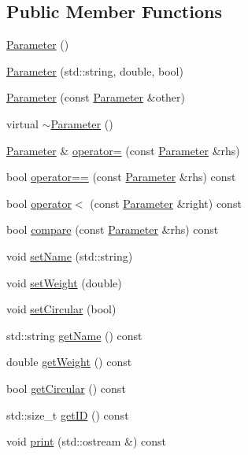 \subsection*{Public Member Functions}
\begin{DoxyCompactItemize}
\item 
\mbox{\hyperlink{classanen_par_1_1_parameter_aada3139ee9b50c2acb90d275c72da550}{Parameter}} ()
\item 
\mbox{\hyperlink{classanen_par_1_1_parameter_a2c0360abe051ca5ca67d812f75987918}{Parameter}} (std\+::string, double, bool)
\item 
\mbox{\hyperlink{classanen_par_1_1_parameter_af9f49a6e54e55e223f14ed4603a49d3a}{Parameter}} (const \mbox{\hyperlink{classanen_par_1_1_parameter}{Parameter}} \&other)
\item 
virtual \mbox{\hyperlink{classanen_par_1_1_parameter_a4077d3eb003469c95671d9f747bb3306}{$\sim$\+Parameter}} ()
\item 
\mbox{\hyperlink{classanen_par_1_1_parameter}{Parameter}} \& \mbox{\hyperlink{classanen_par_1_1_parameter_aebba3af3376eb06f763e3b6d46e68b56}{operator=}} (const \mbox{\hyperlink{classanen_par_1_1_parameter}{Parameter}} \&rhs)
\item 
bool \mbox{\hyperlink{classanen_par_1_1_parameter_a37147dfe637ea7387c4de651e7382606}{operator==}} (const \mbox{\hyperlink{classanen_par_1_1_parameter}{Parameter}} \&rhs) const
\item 
bool \mbox{\hyperlink{classanen_par_1_1_parameter_ab7997cdf149d06b8649754dab02ea4dc}{operator$<$}} (const \mbox{\hyperlink{classanen_par_1_1_parameter}{Parameter}} \&right) const
\item 
bool \mbox{\hyperlink{classanen_par_1_1_parameter_ac7bf17c016c65c6eba495a75cacf5431}{compare}} (const \mbox{\hyperlink{classanen_par_1_1_parameter}{Parameter}} \&rhs) const
\item 
void \mbox{\hyperlink{classanen_par_1_1_parameter_a273b15764bdfae1014bccb2cd4ac42a9}{set\+Name}} (std\+::string)
\item 
void \mbox{\hyperlink{classanen_par_1_1_parameter_acee344040fad3068f321c5fdf6b29cfe}{set\+Weight}} (double)
\item 
void \mbox{\hyperlink{classanen_par_1_1_parameter_a879fc52a86d9bd101d5c7854cb9e44e5}{set\+Circular}} (bool)
\item 
std\+::string \mbox{\hyperlink{classanen_par_1_1_parameter_ab1e583a8c741abd7b595f0b9aa8b22fb}{get\+Name}} () const
\item 
double \mbox{\hyperlink{classanen_par_1_1_parameter_a0e8c475debbd2729a9ded08dc5c0a032}{get\+Weight}} () const
\item 
bool \mbox{\hyperlink{classanen_par_1_1_parameter_a8a9696a3d050e5eaeead8b59cb953ca8}{get\+Circular}} () const
\item 
std\+::size\+\_\+t \mbox{\hyperlink{classanen_par_1_1_parameter_a5d98f6099de9e07686f44026a6926038}{get\+ID}} () const
\item 
void \mbox{\hyperlink{classanen_par_1_1_parameter_a68b12bf8de84ea9ddfd51c764111d102}{print}} (std\+::ostream \&) const
\end{DoxyCompactItemize}
